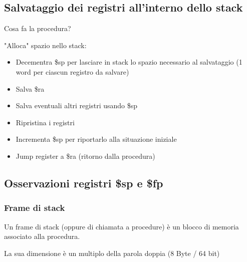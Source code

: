 \begin{center}
\end{center}

\subsection{Salvataggio dei registri all'interno dello stack}
Cosa fa la procedura?

"Alloca" spazio nello stack:
\begin{itemize}
    \item Decementra \$sp per lasciare in stack lo spazio necessario al salvataggio (1 word per ciascun registro da salvare)
    \item Salva \$ra
    \item Salva eventuali altri registri usando \$sp
    \item Ripristina i registri
    \item Incrementa \$sp per riportarlo alla situazione iniziale
    \item Jump register a \$ra (ritorno dalla procedura) 
\end{itemize}

\subsection{Osservazioni registri \$sp e \$fp}
\subsubsection{Frame di stack}
Un frame di stack (oppure di chiamata a procedure) è un blocco di memoria associato alla procedura.

La sua dimensione è un multiplo della parola doppia (8 Byte / 64 bit)

